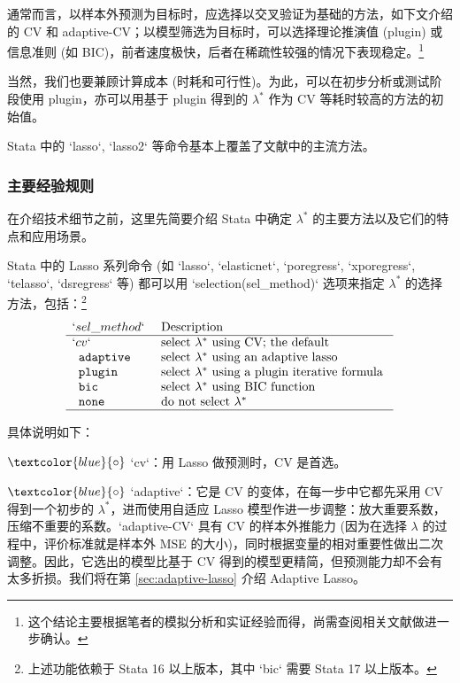 通常而言，以样本外预测为目标时，应选择以交叉验证为基础的方法，如下文介绍的 CV 和 adaptive-CV；以模型筛选为目标时，可以选择理论推演值 (plugin) 或信息准则 (如 BIC)，前者速度极快，后者在稀疏性较强的情况下表现稳定。\footnote{%
       这个结论主要根据笔者的模拟分析和实证经验而得，尚需查阅相关文献做进一步确认。}

当然，我们也要兼顾计算成本 (时耗和可行性)。为此，可以在初步分析或测试阶段使用 plugin，亦可以用基于 plugin 得到的 $\lambda^*$ 作为 CV 等耗时较高的方法的初始值。%

Stata 中的 `lasso`, `lasso2` 等命令基本上覆盖了文献中的主流方法。
\subsubsection{主要经验规则}


在介绍技术细节之前，这里先简要介绍 Stata 中确定 $\lambda^*$ 的主要方法以及它们的特点和应用场景。

Stata 中的 Lasso 系列命令 (如 `lasso`, `elasticnet`, `poregress`, `xporegress`, `telasso`, `dsregress` 等) 都可以用 `selection(sel\_method)` 选项来指定 $\lambda^*$ 的选择方法，包括：\footnote{上述功能依赖于 Stata 16 以上版本，其中 `bic` 需要 Stata 17 以上版本。}
$$
\vspace{-3pt}
\begin{array}{ll}
`sel\_method ` & \text { Description } \\
\hline ` cv` & \text { select $\lambda^*$ using CV; the default } \\
\texttt { adaptive } & \text { select $\lambda^*$ using an adaptive lasso } \\
\texttt { plugin} & \text { select $\lambda^*$ using a plugin iterative formula } \\
\texttt { bic} & \text { select $\lambda^*$ using BIC function } \\
\texttt { none } & \text { do not select $\lambda^*$ } \\
\hline 
\end{array}
$$

\vspace{10pt}
具体说明如下：

$\textcolor{blue}{\circ}$ `cv`：用 Lasso 做预测时，CV 是首选。

$\textcolor{blue}{\circ}$ `adaptive`：它是 $\mathrm{CV}$ 的变体，在每一步中它都先采用 CV 得到一个初步的 $\lambda^{*}$，进而使用自适应 Lasso 模型作进一步调整：放大重要系数，压缩不重要的系数。`adaptive-CV` 具有 CV 的样本外推能力 (因为在选择 $\lambda$ 的过程中，评价标准就是样本外 MSE 的大小)，同时根据变量的相对重要性做出二次调整。因此，它选出的模型比基于 CV 得到的模型更精简，但预测能力却不会有太多折损。我们将在第 \ref{sec:adaptive-lasso} 介绍 Adaptive Lasso。

